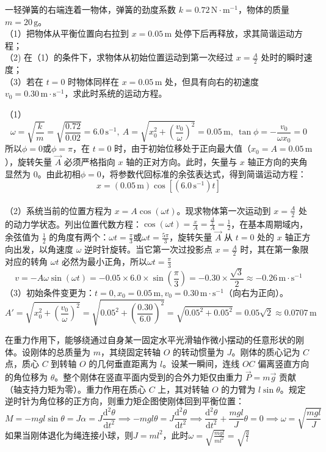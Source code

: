 \documentclass[lang=cn,11pt]{elegantbook}
\begin{document}
\begin{exercise}
一轻弹簧的右端连着一物体，弹簧的劲度系数 $k = 0.72\,\text{N}\cdot\text{m}^{-1}$，物体的质量 $m = 20\,\text{g}$。\\
（1）把物体从平衡位置向右拉到 $x = 0.05\,\text{m}$ 处停下后再释放，求其简谐运动方程；\\
（2) 在（1）的条件下，求物体从初始位置运动到第一次经过 $x = \frac{A}{2}$ 处时的瞬时速度；\\
（3）若在 $t = 0$ 时物体同样在 $x = 0.05\,\text{m}$ 处，但具有向右的初速度 $v_0 = 0.30\,\text{m}\cdot\text{s}^{-1}$，求此时系统的运动方程。
\end{exercise}
\begin{solution}
（1）$$\omega = \sqrt{\frac{k}{m}} = \sqrt{\frac{0.72}{0.02}}= 6.0\,\text{s}^{-1},~A = \sqrt{x_0^2 + \left(\frac{v_0}{\omega}\right)^2} = 0.05\,\text{m},~\tan\phi = -\frac{v_0}{\omega x_0} = 0 $$所以$\phi = 0 \text{或}\phi = \pi$，在 $t=0$ 时，由于初始位移处于正向最大值（$x_0 = A = 0.05\,\text{m}$），旋转矢量 $\vec{A}$ 必须严格指向 $x$ 轴的正对方向。此时，矢量与 $x$ 轴正方向的夹角显然为 $0$。由此初相$\phi = 0$，将参数代回标准的余弦表达式，得到简谐运动方程：\[x = (0.05\,\text{m})\cos\left[\left(6.0\,\text{s}^{-1}\right)t\right]\]\\
（2）系统当前的位置方程为 $x = A\cos(\omega t)$。现求物体第一次运动到 $x = \frac{A}{2}$ 处的动力学状态。列出位置代数方程：$\cos(\omega t) = \frac{x}{A} = \frac{\frac{A}{2}}{A} = \frac{1}{2}$，在基本周期域内，余弦值为 $\frac{1}{2}$ 的角度有两个：$\omega t = \frac{\pi}{3} \text{或}\omega t = \frac{5\pi}{3}$，旋转矢量 $\vec{A}$ 从 $t=0$ 处的 $x$ 轴正方向出发，以角速度 $\omega$ 逆时针旋转。当它第一次过投影点 $x = \frac{A}{2}$ 时，其在第一象限对应的转角 $\omega t$ 必然为最小正角，所以$\omega t = \frac{\pi}{3}$
\[v = -A\omega\sin(\omega t)= -0.05 \times 6.0 \times \sin\left(\frac{\pi}{3}\right) = -0.30 \times \frac{\sqrt{3}}{2} \approx -0.26\,\text{m}\cdot\text{s}^{-1}\]
（3）初始条件变更为：$t = 0, x_0 = 0.05\,\text{m}, v_0 = 0.30\,\text{m}\cdot\text{s}^{-1}$（向右为正向）。$$A' = \sqrt{x_0^2 + \left(\frac{v_0}{\omega}\right)^2} = \sqrt{0.05^2 + \left(\frac{0.30}{6.0}\right)^2} = \sqrt{0.05^2 + 0.05^2} = 0.05\sqrt{2} \approx 0.0707\,\text{m}$$
\end{solution}

\begin{definition}[复摆]
在重力作用下，能够绕通过自身某一固定水平光滑轴作微小摆动的任意形状的刚体。设刚体的总质量为 $m$，其绕固定转轴 $O$ 的转动惯量为 $J$。刚体的质心记为 $C$ 点，质心 $C$ 到转轴 $O$ 的几何垂直距离为 $l$。设某一瞬间，连线 $OC$ 偏离竖直方向的角位移为 $\theta$。整个刚体在竖直平面内受到的合外力矩仅由重力 $\vec{P} = m\vec{g}$ 贡献（轴支持力矩为零）。重力作用在质心 $C$ 上，其对转轴 $O$ 的力臂为 $l\sin\theta$。规定逆时针为角位移的正方向，则重力矩企图使刚体回到平衡位置：$$M = -mgl\sin\theta= J\alpha= J\frac{\mathrm{d}^2\theta}{\mathrm{d}t^2}\implies-mgl\theta = J\frac{\mathrm{d}^2\theta}{\mathrm{d}t^2} \implies \frac{\mathrm{d}^2\theta}{\mathrm{d}t^2} + \frac{mgl}{J}\theta = 0\implies\omega=\sqrt{ \frac{mgl}{J}}$$如果当刚体退化为绳连接小球，则$J=ml^2$，此时$\omega=\sqrt{ \frac{mgl}{ml^2}}=\sqrt{ \frac{g}{l}}$
\end{definition}
\end{document}
